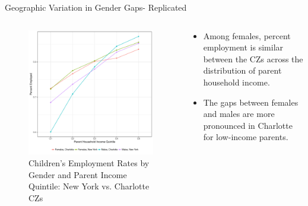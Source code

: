 \documentclass{beamer}
\begin{document}
\begin{frame}{Geographic Variation in Gender Gaps- Replicated}
\begin{columns}
	
	\begin{column}{0.52\textwidth}
		\vspace{\topsep}
		\begin{figure}
		\vspace{-0.5cm}	
		\includegraphics[width=\columnwidth]{../fig2.pdf}
		\caption{{\scriptsize Children’s Employment Rates by Gender and Parent Income Quintile:
			New York vs. Charlotte CZs}}
		\end{figure}	
\end{column}
	
	\begin{column}{0.4\textwidth}
				\vspace{-2.5cm}	
		\begin{itemize}
			\item Among females, percent employment is similar between the CZs across the distribution of parent household income.
			\item The gaps between females and males are more pronounced in Charlotte for low-income parents.
		\end{itemize}
	\end{column}
	
\end{columns}
\end{frame}
\end{document}
